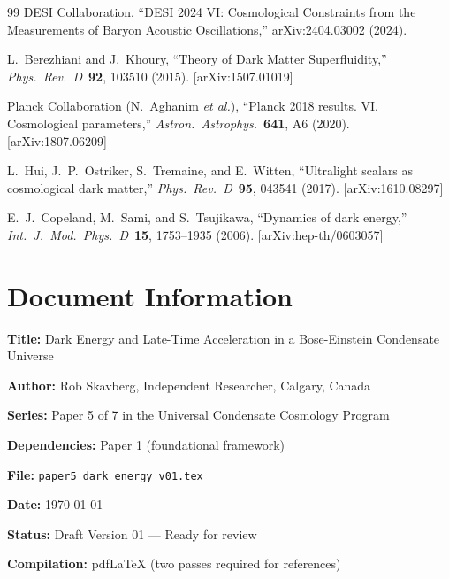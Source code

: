 \documentclass[11pt,a4paper]{article}
\theoremstyle{definition}
\theoremstyle{remark}
\begin{document}
\begin{thebibliography}{99}
DESI Collaboration, ``DESI 2024 VI: Cosmological Constraints from the Measurements of Baryon Acoustic Oscillations,'' arXiv:2404.03002 (2024).

L.~Berezhiani and J.~Khoury, ``Theory of Dark Matter Superfluidity,'' \emph{Phys.\ Rev.\ D}\ \textbf{92}, 103510 (2015). [arXiv:1507.01019]

Planck Collaboration (N.~Aghanim \emph{et al.}), ``Planck 2018 results. VI. Cosmological parameters,'' \emph{Astron.\ Astrophys.}\ \textbf{641}, A6 (2020). [arXiv:1807.06209]

L.~Hui, J.~P.~Ostriker, S.~Tremaine, and E.~Witten, ``Ultralight scalars as cosmological dark matter,'' \emph{Phys.\ Rev.\ D}\ \textbf{95}, 043541 (2017). [arXiv:1610.08297]

E.~J.~Copeland, M.~Sami, and S.~Tsujikawa, ``Dynamics of dark energy,'' \emph{Int.\ J.\ Mod.\ Phys.\ D}\ \textbf{15}, 1753--1935 (2006). [arXiv:hep-th/0603057]

\end{thebibliography}

\section*{Document Information}

\textbf{Title:} Dark Energy and Late-Time Acceleration in a Bose-Einstein Condensate Universe

\textbf{Author:} Rob Skavberg, Independent Researcher, Calgary, Canada

\textbf{Series:} Paper 5 of 7 in the Universal Condensate Cosmology Program

\textbf{Dependencies:} Paper 1 (foundational framework)

\textbf{File:} \texttt{paper5\_dark\_energy\_v01.tex}

\textbf{Date:} \today

\textbf{Status:} Draft Version 01 --- Ready for review

\textbf{Compilation:} pdfLaTeX (two passes required for references)
\end{document}
